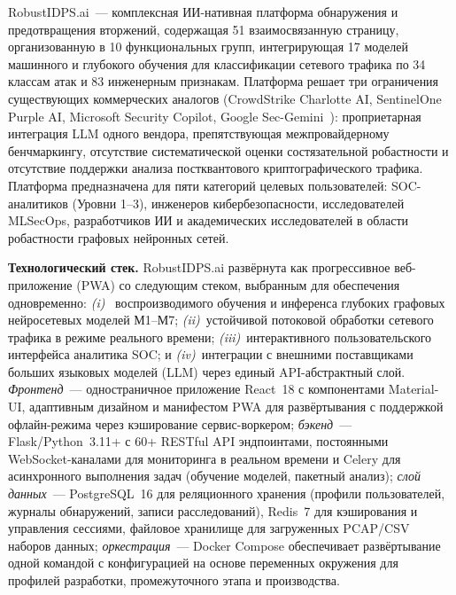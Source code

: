 \textsf{RobustIDPS.ai}~--- комплексная ИИ-нативная платформа
обнаружения и предотвращения вторжений, содержащая 51 взаимосвязанную
страницу, организованную в 10 функциональных групп, интегрирующая 17
моделей машинного и глубокого обучения для классификации сетевого
трафика по 34 классам атак и 83 инженерным признакам. Платформа
решает три ограничения существующих коммерческих аналогов
(CrowdStrike Charlotte AI, SentinelOne Purple AI, Microsoft Security
Copilot, Google Sec-Gemini~\cite{Smith2023}): проприетарная
интеграция LLM одного вендора, препятствующая межпровайдерному
бенчмаркингу, отсутствие систематической оценки состязательной
робастности и отсутствие поддержки анализа постквантового
криптографического трафика. Платформа предназначена для пяти
категорий целевых пользователей: SOC-аналитиков (Уровни 1--3),
инженеров кибербезопасности, исследователей MLSecOps, разработчиков
ИИ и академических исследователей в области робастности графовых
нейронных сетей.

\noindent\textbf{Технологический стек.} \textsf{RobustIDPS.ai}
развёрнута как прогрессивное веб-приложение (PWA) со следующим
стеком, выбранным для обеспечения одновременно: \emph{(i)}~
воспроизводимого обучения и инференса глубоких графовых
нейросетевых моделей М1--М7; \emph{(ii)}~устойчивой потоковой
обработки сетевого трафика в режиме реального времени;
\emph{(iii)}~интерактивного пользовательского интерфейса аналитика
SOC; и \emph{(iv)}~интеграции с внешними поставщиками больших
языковых моделей (LLM) через единый API-абстрактный слой.
\emph{Фронтенд}~--- одностраничное приложение React~18 с
компонентами Material-UI, адаптивным дизайном и манифестом PWA для
развёртывания с поддержкой офлайн-режима через кэширование
сервис-воркером; \emph{бэкенд}~--- Flask/Python~3.11+ с 60+ RESTful
API эндпоинтами, постоянными WebSocket-каналами для мониторинга в
реальном времени и Celery для асинхронного выполнения задач
(обучение моделей, пакетный анализ); \emph{слой данных}~---
PostgreSQL~16 для реляционного хранения (профили пользователей,
журналы обнаружений, записи расследований), Redis~7 для кэширования
и управления сессиями, файловое хранилище для загруженных PCAP/CSV
наборов данных; \emph{оркестрация}~--- Docker Compose обеспечивает
развёртывание одной командой с конфигурацией на основе переменных
окружения для профилей разработки, промежуточного этапа и
производства.

